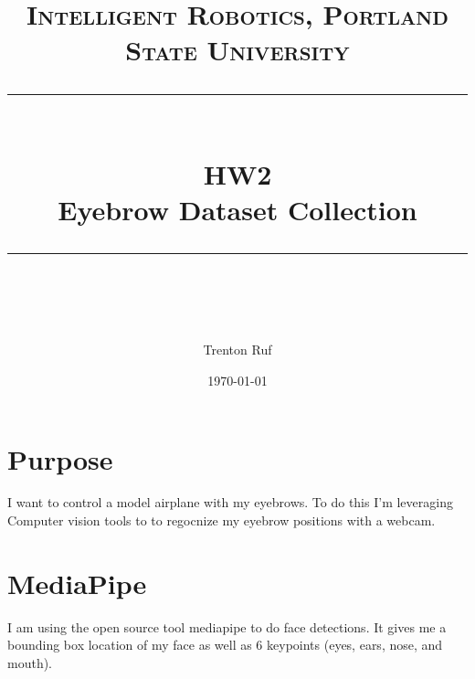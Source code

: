 \documentclass[11pt]{scrartcl} %
\title{	
	\normalfont\normalsize
	\textsc{Intelligent Robotics, Portland State University}\\ %
	\vspace{25pt} %
	\rule{\linewidth}{0.5pt}\\ %
	\vspace{20pt} %
	{\huge HW2}\\ %
	\vspace{4pt} %
	{\large Eyebrow Dataset Collection}\\ %
	\vspace{12pt} %
	\rule{\linewidth}{2pt}\\ %
	\vspace{12pt} %
}
\author{\LARGE Trenton Ruf} %
\date{\normalsize \today} %
\begin{document}
\maketitle %




\renewcommand\thesubsection{\Roman{subsection}}
\section{Purpose}
I want to control a model airplane with my eyebrows. To do this I'm leveraging Computer vision tools to to regocnize my eyebrow positions with a webcam.
\section{MediaPipe}
I am using the open source tool mediapipe to do face detections. It gives me a bounding box location of my face as well as 6 keypoints (eyes, ears, nose, and mouth).  


\end{document}
